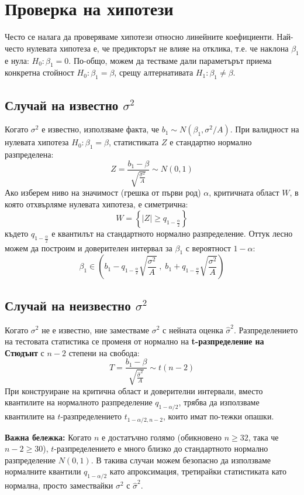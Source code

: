 \documentclass{article}
\begin{document}
\section{Проверка на хипотези}

Често се налага да проверяваме хипотези относно линейните коефициенти. Най-често нулевата хипотеза е, че предикторът не влияе на отклика, т.е. че наклона $\beta_1$ е нула: $H_0: \beta_1 = 0$. По-общо, можем да тестваме дали параметърът приема конкретна стойност $H_0: \beta_1 = \beta$, срещу алтернативата $H_1: \beta_1 \neq \beta$.

\subsection{Случай на известно $\sigma^2$}
Когато $\sigma^2$ е известно, използваме факта, че $b_1 \sim N(\beta_1, \sigma^2/A)$. При валидност на нулевата хипотеза $H_0: \beta_1 = \beta$, статистиката $Z$ е стандартно нормално разпределена:
\[
Z = \frac{b_1 - \beta}{\sqrt{\frac{\sigma^2}{A}}} \sim N(0, 1)
\]
Ако изберем ниво на значимост (грешка от първи род) $\alpha$, критичната област $W$, в която отхвърляме нулевата хипотеза, е симетрична:
\[
W = \left\{ |Z| \geq q_{1-\frac{\alpha}{2}} \right\}
\]
където $q_{1-\frac{\alpha}{2}}$ е квантилът на стандартното нормално разпределение. 
Оттук лесно можем да построим и доверителен интервал за $\beta_1$ с вероятност $1-\alpha$:
\[
\beta_1 \in \left( b_1 - q_{1-\frac{\alpha}{2}}\sqrt{\frac{\sigma^2}{A}} \; , \; b_1 + q_{1-\frac{\alpha}{2}}\sqrt{\frac{\sigma^2}{A}} \right)
\]

\subsection{Случай на неизвестно $\sigma^2$}
Когато $\sigma^2$ не е известно, ние заместваме $\sigma^2$ с нейната оценка $\hat{\sigma}^2$. Разпределението на тестовата статистика се променя от нормално на \textbf{t-разпределение на Стюдънт} с $n-2$ степени на свобода:
\[
T = \frac{b_1 - \beta}{\sqrt{\frac{\hat{\sigma}^2}{A}}} \sim t(n-2)
\]
При конструиране на критична област и доверителни интервали, вместо квантилите на нормалното разпределение $q_{1-\alpha/2}$, трябва да използваме квантилите на $t$-разпределението $t_{1-\alpha/2, n-2}$, които имат по-тежки опашки.

\textbf{Важна бележка:} Когато $n$ е достатъчно голямо (обикновено $n \geq 32$, така че $n-2 \geq 30$), $t$-разпределението е много близко до стандартното нормално разпределение $N(0,1)$. В такива случаи можем безопасно да използваме нормалните квантили $q_{1-\alpha/2}$ като апроксимация, третирайки статистиката като нормална, просто замествайки $\sigma^2$ с $\hat{\sigma}^2$.
\end{document}

